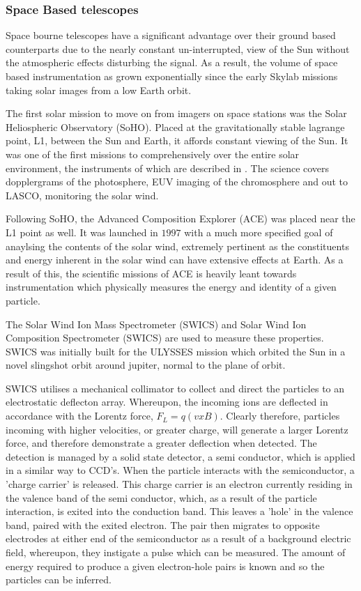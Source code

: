 \subsubsection{Space Based telescopes}

Space bourne telescopes have a significant advantage over their ground based counterparts due to the nearly constant un-interrupted, view of the Sun without the atmospheric effects disturbing the signal.
As a result, the volume of space based instrumentation as grown exponentially since the early Skylab missions taking solar images from a low Earth orbit.

The first solar mission to move on from imagers on space stations was the Solar Heliospheric Observatory (SoHO).
Placed at the gravitationally stable lagrange point, L1, between the Sun and Earth, it affords constant viewing of the Sun.
It was one of the first missions to comprehensively over the entire solar environment, the instruments of which are described in \cite{StCyr}.
The science covers dopplergrams of the photosphere, EUV imaging of the chromosphere and out to LASCO, monitoring the solar wind.

Following SoHO, the Advanced Composition Explorer (ACE) \citep{Garrard1997} was placed near the L1 point as well.
It was launched in $1997$ with a much more specified goal of anaylsing the contents of the solar wind, extremely pertinent as the constituents and energy inherent in the solar wind can have extensive effects at Earth.
As a result of this, the scientific missions of ACE is heavily leant towards instrumentation which physically measures the energy and identity of a given particle.

The Solar Wind Ion Mass Spectrometer (SWICS) and Solar Wind Ion Composition Spectrometer (SWICS) are used to measure these properties.
SWICS was initially built for the ULYSSES \cite{Ulysses1992} mission which orbited the Sun in a novel slingshot orbit around jupiter, normal to the plane of orbit.

SWICS utilises a mechanical collimator to collect and direct the particles to an electrostatic deflecton array.
Whereupon, the incoming ions are deflected in accordance with the Lorentz force, $F_L = q(v x B)$.
Clearly therefore, particles incoming with higher velocities, or greater charge, will generate a larger Lorentz force, and therefore demonstrate a greater deflection when detected.
The detection is managed by a solid state detector, a semi conductor, which is applied in a similar way to CCD's.
When the particle interacts with the semiconductor, a 'charge carrier' is released.
This charge carrier is an electron currently residing in the valence band of the semi conductor, which, as a result of the particle interaction, is exited into the conduction band.
This leaves a 'hole' in the valence band, paired with the exited electron. 
The pair then migrates to opposite electrodes at either end of the semiconductor as a result of a background electric field, whereupon, they instigate a pulse which can be measured.
The amount of energy required to produce a given electron-hole pairs is known and so the particles can be inferred.

